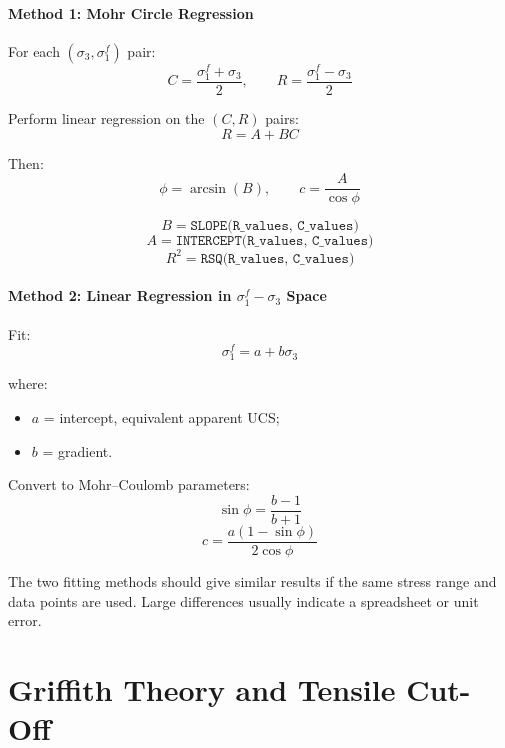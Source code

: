 \paragraph{Method 1: Mohr Circle Regression}

For each \((\sigma_3,\sigma_1^f)\) pair:
\[
C = \frac{\sigma_1^f+\sigma_3}{2},
\qquad
R = \frac{\sigma_1^f-\sigma_3}{2}
\]

Perform linear regression on the \((C,R)\) pairs:
\[
R = A + B C
\]

Then:
\[
\phi = \arcsin(B),
\qquad
c = \frac{A}{\cos\phi}
\]

\begin{calcbox}
\[
B = \texttt{SLOPE(R\_values, C\_values)}
\]
\[
A = \texttt{INTERCEPT(R\_values, C\_values)}
\]
\[
R^2 = \texttt{RSQ(R\_values, C\_values)}
\]
\end{calcbox}

\paragraph{Method 2: Linear Regression in \(\sigma_1^f-\sigma_3\) Space}

Fit:
\[
\sigma_1^f = a + b\sigma_3
\]

where:
\begin{itemize}
 \item \(a\) = intercept, equivalent apparent UCS;
 \item \(b\) = gradient.
\end{itemize}

Convert to Mohr--Coulomb parameters:
\[
\sin\phi = \frac{b-1}{b+1}
\]
\[
c =
\frac{a(1-\sin\phi)}
{2\cos\phi}
\]

\begin{notebox}
The two fitting methods should give similar results if the same stress range and data
points are used. Large differences usually indicate a spreadsheet or unit error.
\end{notebox}

\section{Griffith Theory and Tensile Cut-Off}

